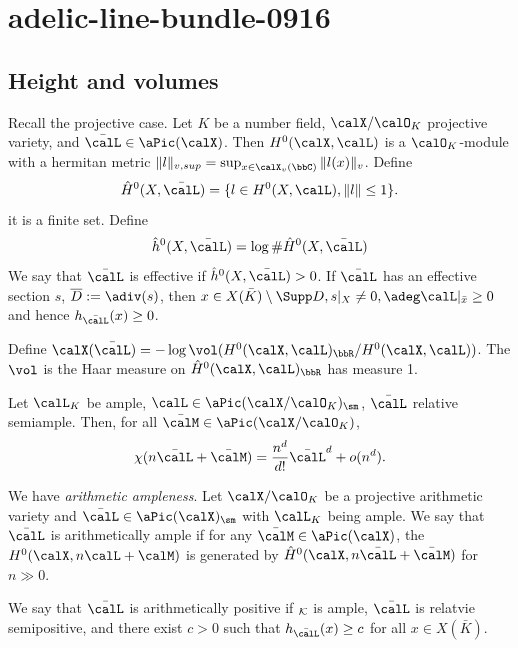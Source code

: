 \section{adelic-line-bundle-0916}

\subsection[status=draft,tag=0000000,label=\labelNFM{subsec:height-and-volumes}]{Height and volumes}

Recall the projective case.
Let $K$ be a number field, $\calX/\calO_K$ projective variety, and $\bar{\calL} \in \aPic(\calX)$.
Then $H^0(\calX,\calL)$ is a $\calO_K$-module with a hermitan metric $\|l\|_{v,sup} = \sup_{x \in \calX_v(\bbC)} \|l(x)\|_v$.
Define
\[ \hat{H}^0(X,\bar{\calL}) = \{l \in H^0(X,\calL), \|l\| \leq 1  \}. \]
it is a finite set.
Define
\[ \hat{h}^0(X,\bar{\calL}) = \log \# \hat{H}^0(X,\bar{\calL}) \]
We say that $\bar{\calL}$ is effective if $\hat{h}^0(X,\bar{\calL}) > 0$.
If $\bar{\calL}$ has an effective section $s$, $\overline{D} := \adiv(s)$, then $x \in X(\bar{K}) \setminus \Supp D, s|_X \neq 0, \adeg \calL|_{\bar{x}} \geq 0$ and hence $h_{\bar{\calL}}(x) \geq 0$.

Define $\calX(\bar{\calL}) = - \log \vol (H^0(\calX,\calL)_\bbR / H^0(\calX,\calL))$.
The $\vol$ is the Haar measure on $\hat{H}^0(\calX,\calL)_\bbR$ has measure 1.

\begin{theorem}[label=\labelNFM{thm:hilbert-samuel}, status=draft, tag=0000000]
	Let $\calL_K$ be ample, $\calL \in \aPic(\calX/\calO_K)_\sm$, $\bar{\calL}$ relative semiample.
	Then, for all $\bar{\calM} \in \aPic(\calX/\calO_K)$,
	\[ \chi(n\bar{\calL} + \bar{\calM}) = \frac{n^d}{d!} \bar{\calL}^d + o(n^d). \]
\end{theorem}

We have \emph{arithmetic ampleness}.
Let $\calX/\calO_K$ be a projective arithmetic variety and $\bar{\calL} \in \aPic(\calX)_\sm$ with $\calL_K$ being ample.
We say that $\bar{\calL}$ is arithmetically ample if for any $\bar{\calM} \in \aPic(\calX)$, the $H^0(\calX,n\calL+\calM)$ is generated by $\hat{H}^0(\calX,n\bar{\calL}+\bar{\calM})$ for $n \gg 0$.

We say that $\bar{\calL}$ is arithmetically positive if $\cal_K$ is ample, $\bar{\calL}$ is relatvie semipositive, and there exist $c > 0$ such that $h_{\bar{\calL}}(x) \geq c$ for all $x \in X(\bar{K})$.

